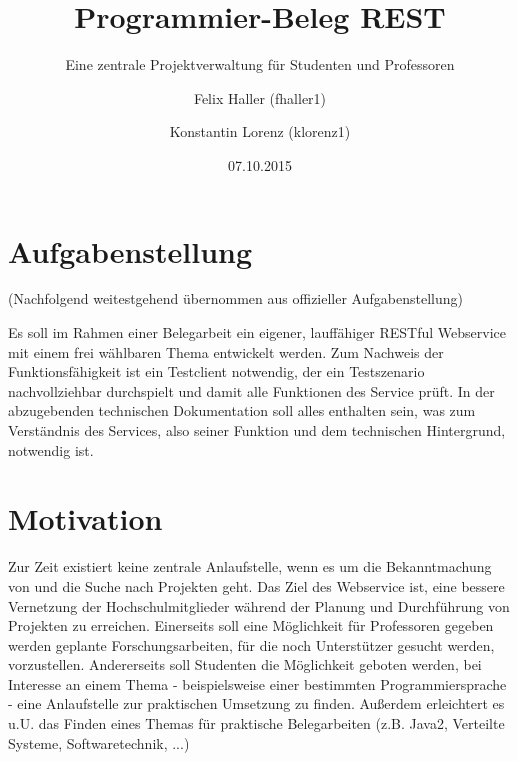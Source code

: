 \documentclass[12pt]{scrartcl}
\begin{document}
	
	
	\subject{Verteilte Systeme}
	\title{Programmier-Beleg REST}
	\subtitle{Eine zentrale Projektverwaltung für Studenten und Professoren}
	\author{Felix Haller (fhaller1) \and Konstantin Lorenz (klorenz1)}
	\date{07.10.2015}
	\publishers{Prüfer: Prof. Dr.-Ing. Andreas Ittner}
	\maketitle
	\thispagestyle{empty} 
	\newpage
	\tableofcontents
	\thispagestyle{empty}
	\newpage	
	\setcounter{page}{1} 
	
	
	
	\section{Aufgabenstellung}
		(Nachfolgend weitestgehend übernommen aus offizieller Aufgabenstellung)
		
		Es soll im Rahmen einer Belegarbeit ein eigener, lauffähiger RESTful Webservice mit einem frei wählbaren Thema entwickelt
		werden. Zum Nachweis der Funktionsfähigkeit ist ein Testclient notwendig, der ein Testszenario nachvollziehbar durchspielt und damit alle Funktionen des Service prüft. In der abzugebenden technischen Dokumentation soll alles enthalten sein, was zum Verständnis des Services, also seiner Funktion und dem technischen Hintergrund, notwendig ist.
		
	\section{Motivation}
		Zur Zeit existiert keine zentrale Anlaufstelle, wenn es um die Bekanntmachung von und die Suche nach Projekten geht. Das Ziel des Webservice ist, eine bessere Vernetzung der Hochschulmitglieder während der Planung und Durchführung von Projekten zu erreichen. Einerseits soll eine Möglichkeit für Professoren gegeben werden geplante Forschungsarbeiten, für die noch Unterstützer gesucht werden, vorzustellen. Andererseits soll Studenten die Möglichkeit geboten werden, bei Interesse an einem Thema - beispielsweise einer bestimmten Programmiersprache - eine Anlaufstelle zur praktischen Umsetzung zu finden. Außerdem erleichtert es u.U. das Finden eines Themas für praktische Belegarbeiten (z.B. Java2, Verteilte Systeme, Softwaretechnik, ...)
\end{document}
